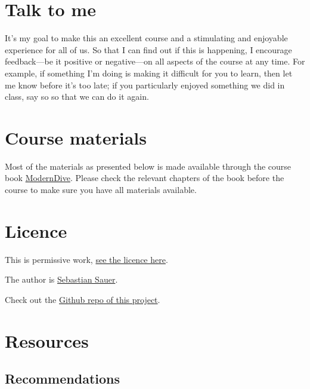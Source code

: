 \documentclass[
  letterpaper,
  DIV=11,
  numbers=noendperiod]{scrreprt}
\theoremstyle{definition}
\theoremstyle{definition}
\theoremstyle{remark}
\begin{document}
\hypertarget{talk-to-me}{%
\section*{Talk to me}\label{talk-to-me}}

It's my goal to make this an excellent course and a stimulating and
enjoyable experience for all of us. So that I can find out if this is
happening, I encourage feedback---be it positive or negative---on all
aspects of the course at any time. For example, if something I'm doing
is making it difficult for you to learn, then let me know before it's
too late; if you particularly enjoyed something we did in class, say so
so that we can do it again.

\hypertarget{course-materials}{%
\section*{Course materials}\label{course-materials}}

Most of the materials as presented below is made available through the
course book \href{https://moderndive.com/index.html}{ModernDive}. Please
check the relevant chapters of the book before the course to make sure
you have all materials available.

\hypertarget{licence}{%
\section*{Licence}\label{licence}}

This is permissive work,
\href{https://github.com/sebastiansauer/stats-nutshell/blob/main/LICENSE}{see
the licence here}.

The author is
\href{https://sebastiansauer-academic.netlify.app/}{Sebastian Sauer}.

Check out the
\href{https://github.com/sebastiansauer/stats-nutshell}{Github repo of
this project}.

\hypertarget{resources}{%
\section*{Resources}\label{resources}}

\hypertarget{recommendations}{%
\subsection*{Recommendations}\label{recommendations}}
\end{document}
